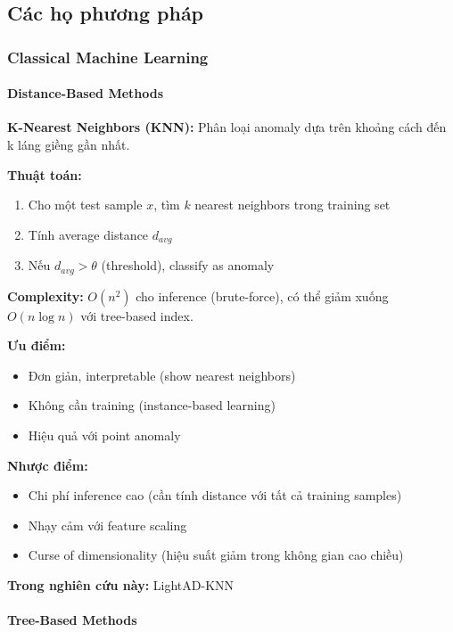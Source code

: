 \subsection{Các họ phương pháp}
\label{subsec:method-families}

\subsubsection{Classical Machine Learning}

\paragraph{Distance-Based Methods}

\textbf{K-Nearest Neighbors (KNN):} Phân loại anomaly dựa trên khoảng cách đến k láng giềng gần nhất.

\textbf{Thuật toán:}
\begin{enumerate}
    \item Cho một test sample $x$, tìm $k$ nearest neighbors trong training set
    \item Tính average distance $d_{avg}$
    \item Nếu $d_{avg} > \theta$ (threshold), classify as anomaly
\end{enumerate}

\textbf{Complexity:} $O(n^2)$ cho inference (brute-force), có thể giảm xuống $O(n \log n)$ với tree-based index.

\textbf{Ưu điểm:}
\begin{itemize}
    \item Đơn giản, interpretable (show nearest neighbors)
    \item Không cần training (instance-based learning)
    \item Hiệu quả với point anomaly
\end{itemize}

\textbf{Nhược điểm:}
\begin{itemize}
    \item Chi phí inference cao (cần tính distance với tất cả training samples)
    \item Nhạy cảm với feature scaling
    \item Curse of dimensionality (hiệu suất giảm trong không gian cao chiều)
\end{itemize}

\textbf{Trong nghiên cứu này:} LightAD-KNN

\paragraph{Tree-Based Methods}

